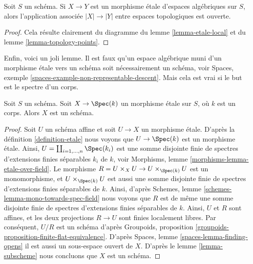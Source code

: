 \begin{lemma}
\label{lemma-etale-open}
Soit $S$ un schéma.
Si $X \to Y$ est un morphisme \'etale d'espaces algébriques sur $S$,
alors l'application associée $|X| \to |Y|$ entre espaces topologiques
est ouverte.
\end{lemma}

\begin{proof}
Cela résulte clairement du diagramme du
lemme \ref{lemma-etale-local}
et du
lemme \ref{lemma-topology-points}.
\end{proof}

\noindent
Enfin, voici un joli lemme. Il est faux qu'un espace algébrique
muni d'un morphisme \'etale vers un schéma soit nécessairement un schéma, voir
Spaces, exemple \ref{spaces-example-non-representable-descent}.
Mais cela est vrai si le but est le spectre d'un corps.

\begin{lemma}
\label{lemma-etale-over-field-scheme}
Soit $S$ un schéma. Soit $X \to \Spec(k)$
un morphisme \'etale sur $S$, où $k$ est un corps.
Alors $X$ est un schéma.
\end{lemma}

\begin{proof}
Soit $U$ un schéma affine et soit $U \to X$ un morphisme \'etale. D'après la
définition \ref{definition-etale}
nous voyons que $U \to \Spec(k)$ est un morphisme \'etale.
Ainsi, $U = \coprod_{i = 1, \ldots, n} \Spec(k_i)$
est une somme disjointe finie de spectres d'extensions finies séparables
$k_i$ de $k$, voir
Morphisms, lemme \ref{morphisms-lemma-etale-over-field}.
Le morphisme $R = U \times_X U \to U \times_{\Spec(k)} U$ est un monomorphisme,
et $U \times_{\Spec(k)} U$ est aussi une somme disjointe finie de
spectres d'extensions finies séparables de $k$. Ainsi, d'après
Schemes, lemme \ref{schemes-lemma-mono-towards-spec-field}
nous voyons que $R$ est de même une somme disjointe finie de
spectres d'extensions finies séparables de $k$.
Ainsi, $U$ et $R$ sont affines, et
les deux projections $R \to U$ sont finies localement libres.
Par conséquent, $U/R$ est un schéma d'après
Groupoids, proposition \ref{groupoids-proposition-finite-flat-equivalence}.
D'après
Spaces, lemme \ref{spaces-lemma-finding-opens}
il est aussi un sous-espace ouvert de $X$. D'après le
lemme \ref{lemma-subscheme}
nous concluons que $X$ est un schéma.
\end{proof}













